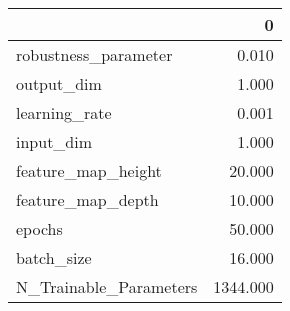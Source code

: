 \begin{tabular}{lr}
\toprule
{} &         0 \\
\midrule
robustness\_parameter   &     0.010 \\
output\_dim             &     1.000 \\
learning\_rate          &     0.001 \\
input\_dim              &     1.000 \\
feature\_map\_height     &    20.000 \\
feature\_map\_depth      &    10.000 \\
epochs                 &    50.000 \\
batch\_size             &    16.000 \\
N\_Trainable\_Parameters &  1344.000 \\
\bottomrule
\end{tabular}
